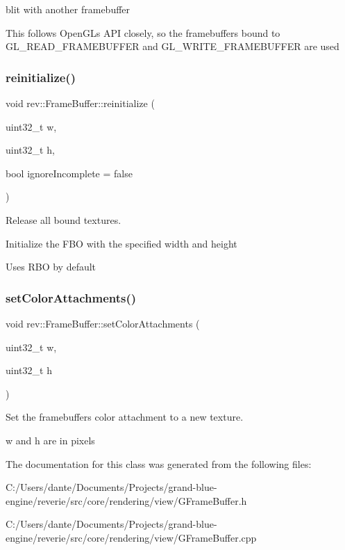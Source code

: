 blit with another framebuffer 

This follows Open\+GL\textquotesingle{}s A\+PI closely, so the framebuffers bound to G\+L\+\_\+\+R\+E\+A\+D\+\_\+\+F\+R\+A\+M\+E\+B\+U\+F\+F\+ER and G\+L\+\_\+\+W\+R\+I\+T\+E\+\_\+\+F\+R\+A\+M\+E\+B\+U\+F\+F\+ER are used \mbox{\label{classrev_1_1_frame_buffer_ab6415b100449eb4c2332a5a3e9f93d26}} 
\subsubsection{\texorpdfstring{reinitialize()}{reinitialize()}}
{\footnotesize\ttfamily void rev\+::\+Frame\+Buffer\+::reinitialize (\begin{DoxyParamCaption}\item[{uint32\+\_\+t}]{w,  }\item[{uint32\+\_\+t}]{h,  }\item[{bool}]{ignore\+Incomplete = {\ttfamily false} }\end{DoxyParamCaption})}



Release all bound textures. 

Initialize the F\+BO with the specified width and height

Uses R\+BO by default \mbox{\label{classrev_1_1_frame_buffer_a477861e1360aa2ac238c36f7421faa1f}} 
\subsubsection{\texorpdfstring{setColorAttachments()}{setColorAttachments()}}
{\footnotesize\ttfamily void rev\+::\+Frame\+Buffer\+::set\+Color\+Attachments (\begin{DoxyParamCaption}\item[{uint32\+\_\+t}]{w,  }\item[{uint32\+\_\+t}]{h }\end{DoxyParamCaption})\hspace{0.3cm}{\ttfamily [protected]}}



Set the framebuffer\textquotesingle{}s color attachment to a new texture. 

w and h are in pixels 

The documentation for this class was generated from the following files\+:\begin{DoxyCompactItemize}
\item 
C\+:/\+Users/dante/\+Documents/\+Projects/grand-\/blue-\/engine/reverie/src/core/rendering/view/G\+Frame\+Buffer.\+h\item 
C\+:/\+Users/dante/\+Documents/\+Projects/grand-\/blue-\/engine/reverie/src/core/rendering/view/G\+Frame\+Buffer.\+cpp\end{DoxyCompactItemize}

